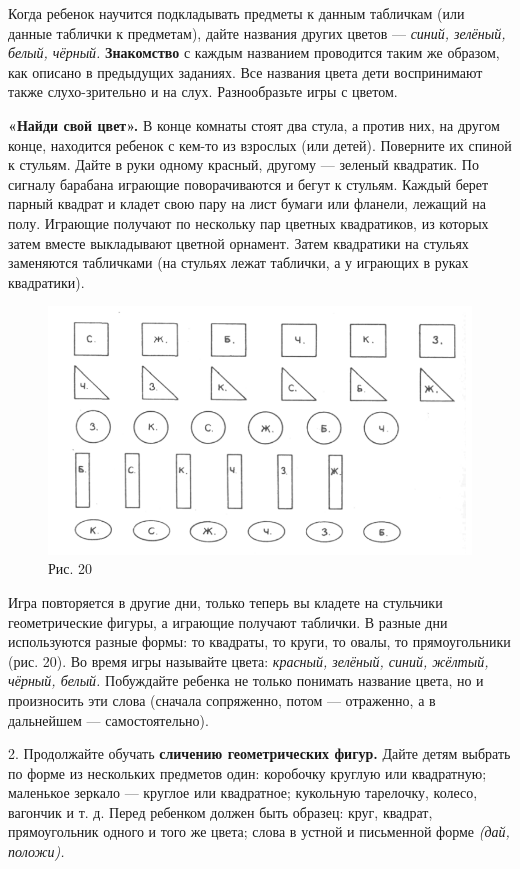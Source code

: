 \documentclass[a5paper]{book}
\renewcommand{\emph}[1]{\textit{#1}}
\begin{document}
Когда ребенок научится подкладывать предметы к данным табличкам (или
данные таблички к предметам), дайте названия других цветов ---
\emph{синий, зелёный, белый, чёрный.} \textbf{Знакомство} с каждым
названием проводится таким же образом, как описано в предыдущих
заданиях. Все названия цвета дети воспринимают также слухо-зрительно и
на слух. Разнообразьте игры с цветом.

\textbf{«Найди свой цвет».} В конце комнаты стоят два стула, а против
них, на другом конце, находится ребенок с кем-то из взрослых (или
детей). Поверните их спиной к стульям. Дайте в руки одному красный,
другому --- зеленый квадратик. По сигналу барабана играющие
поворачиваются и бегут к стульям. Каждый берет парный квадрат и кладет
свою пару на лист бумаги или фланели, лежащий на полу. Играющие получают
по нескольку пар цветных квадратиков, из которых затем вместе
выкладывают цветной орнамент. Затем квадратики на стульях заменяются
табличками (на стульях лежат таблички, а у играющих в руках квадратики).

\begin{figure}
\centering
\includegraphics[width=\linewidth]{media/media/image17.png}
\caption*{Рис. 20}
\end{figure}


Игра повторяется в другие дни, только теперь вы кладете на стульчики
геометрические фигуры, а играющие получают таблички. В разные дни
используются разные формы: то квадраты, то круги, то овалы, то
прямоугольники (рис. 20). Во время игры называйте цвета: \emph{красный,
зелёный, синий, жёлтый, чёрный, белый.} Побуждайте ребенка не только
понимать название цвета, но и произносить эти слова (сначала сопряженно,
потом --- отраженно, а в дальнейшем --- самостоятельно).

2. Продолжайте обучать \textbf{сличению геометрических фигур.} Дайте
детям выбрать по форме из нескольких предметов один: коробочку круглую
или квадратную; маленькое зеркало --- круглое или квадратное; кукольную
тарелочку, колесо, вагончик и т. д. Перед ребенком должен быть образец:
круг, квадрат, прямоугольник одного и того же цвета; слова в устной и
письменной форме \emph{(дай, положи).}
\end{document}
